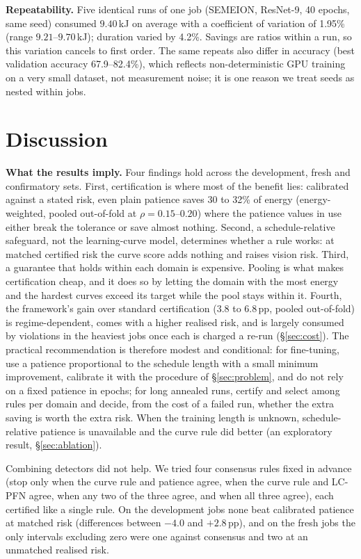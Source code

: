 \documentclass[3p,twocolumn,10pt]{elsarticle}
\theoremstyle{definition}
\begin{document}
\textbf{Repeatability.} Five identical runs of one job (SEMEION, ResNet-9, 40 epochs, same seed) consumed $9.40$\,kJ on average with a coefficient of variation of 1.95\% (range $9.21$--$9.70$\,kJ); duration varied by 4.2\%. Savings are ratios within a run, so this variation cancels to first order. The same repeats also differ in accuracy (best validation accuracy 67.9--82.4\%), which reflects non-deterministic GPU training on a very small dataset, not measurement noise; it is one reason we treat seeds as nested within jobs.

\section{Discussion}
\label{sec:discussion}

\textbf{What the results imply.} Four findings hold across the development, fresh and confirmatory sets. First, certification is where most of the benefit lies: calibrated against a stated risk, even plain patience saves 30 to 32\% of energy (energy-weighted, pooled out-of-fold at $\rho=0.15$--$0.20$) where the patience values in use either break the tolerance or save almost nothing. Second, a schedule-relative safeguard, not the learning-curve model, determines whether a rule works: at matched certified risk the curve score adds nothing and raises vision risk. Third, a guarantee that holds within each domain is expensive. Pooling is what makes certification cheap, and it does so by letting the domain with the most energy and the hardest curves exceed its target while the pool stays within it. Fourth, the framework's gain over standard certification (3.8 to 6.8\,pp, pooled out-of-fold) is regime-dependent, comes with a higher realised risk, and is largely consumed by violations in the heaviest jobs once each is charged a re-run (\S\ref{sec:cost}). The practical recommendation is therefore modest and conditional: for fine-tuning, use a patience proportional to the schedule length with a small minimum improvement, calibrate it with the procedure of \S\ref{sec:problem}, and do not rely on a fixed patience in epochs; for long annealed runs, certify and select among rules per domain and decide, from the cost of a failed run, whether the extra saving is worth the extra risk. When the training length is unknown, schedule-relative patience is unavailable and the curve rule did better (an exploratory result, \S\ref{sec:ablation}).

Combining detectors did not help. We tried four consensus rules fixed in advance (stop only when the curve rule and patience agree, when the curve rule and LC-PFN agree, when any two of the three agree, and when all three agree), each certified like a single rule. On the development jobs none beat calibrated patience at matched risk (differences between $-4.0$ and $+2.8$\,pp), and on the fresh jobs the only intervals excluding zero were one against consensus and two at an unmatched realised risk.
\end{document}
